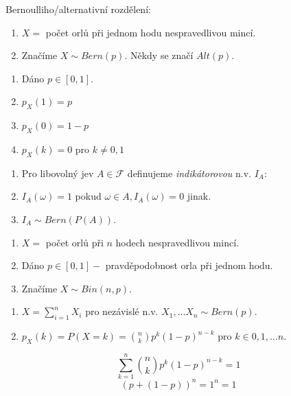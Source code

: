 \documentclass[../main.tex]{subfiles}
\begin{document}
\begin{definition}
    Bernoulliho/alternativní rozdělení:

    \begin{enumerate}
        \item $X = $ počet orlů při jednom hodu nespravedlivou mincí.
        \item Značíme $X \sim Bern(p)$. Někdy se značí $Alt(p)$.
    \end{enumerate}

    \begin{enumerate}
        \item Dáno $p \in [0,1]$.
        \item $p_X(1)=p$
        \item $p_X(0) = 1 - p$
        \item $p_X(k) = 0$ pro $k \neq 0,1$
    \end{enumerate}

    \begin{enumerate}
        \item Pro libovolný jev $A \in \mathcal{F}$ definujeme \textit{indikátorovou} n.v. $I_A$:
        \item $I_A(\omega) = 1$ pokud $\omega \in A, I_A(\omega) = 0$ jinak.
        \item $I_A \sim  Bern(P(A))$.
    \end{enumerate}
\end{definition}

\begin{definition}
    \begin{enumerate}
        \item $X = $ počet orlů při $n$ hodech nespravedlivou mincí.
        \item Dáno $p \in [0,1] - $ pravděpodobnost orla při jednom hodu.
        \item Značíme $X \sim Bin(n,p)$. 
    \end{enumerate}
    \begin{enumerate}
        \item $X = \sum^n_{i=1}X_i$ pro nezávislé n.v. $X_1,\dots X_n \sim Bern(p)$.
        \item $p_X(k) = P(X = k) = \binom{n}{k}p^k(1-p)^{n-k}$ pro $k\in {0,1,\dots n}$.
    \end{enumerate}
    \[\sum^n_{k=1}\binom{n}{k}p^k(1-p)^{n-k} = 1\]
    \[(p + (1-p))^n = 1^n = 1\]
\end{definition}
\end{document}
